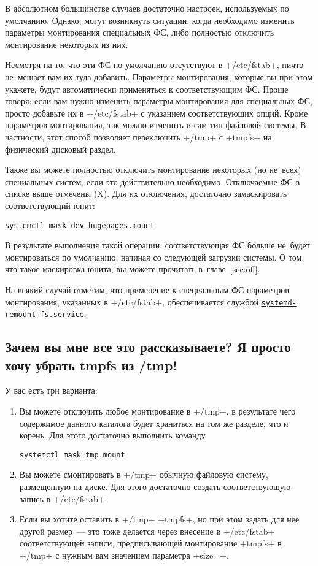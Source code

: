 \documentclass[10pt,oneside,a4paper]{article}
\newcommand{\hreftt}[2]{\href{#1}{\texttt{#2}}}
\begin{document}
В абсолютном большинстве случаев достаточно настроек, используемых по умолчанию.
Однако, могут возникнуть ситуации, когда необходимо изменить параметры
монтирования специальных ФС, либо полностью отключить монтирование некоторых из
них.

Несмотря на то, что эти ФС по умолчанию отсутствуют в +/etc/fstab+, ничто
не~мешает вам их туда добавить. Параметры монтирования, которые вы при этом
укажете, будут автоматически применяться к соответствующим ФС. Проще говоря:
если вам нужно изменить параметры монтирования для специальных ФС, просто
добавьте их в +/etc/fstab+ с указанием соответствующих опций. Кроме параметров
монтирования, так можно изменить и сам тип файловой системы. В частности, этот
способ позволяет переключить +/tmp+ с +tmpfs+ на физический дисковый раздел.

Также вы можете полностью отключить монтирование некоторых (но не~всех)
специальных систем, если это действительно необходимо. Отключаемые ФС в списке
выше отмечены (X). Для их отключения, достаточно замаскировать соответствующий
юнит:
\begin{Verbatim}
systemctl mask dev-hugepages.mount
\end{Verbatim}

В результате выполнения такой операции, соответствующая ФС больше не~будет
монтироваться по умолчанию, начиная со следующей загрузки системы. О том, что
такое маскировка юнита, вы можете прочитать в~главе~\ref{sec:off}.

На всякий случай отметим, что применение к специальным ФС параметров монтирования,
указанных в +/etc/fstab+, обеспечивается службой
\hreftt{http://www.freedesktop.org/software/systemd/man/systemd-remount-fs.service.html}%
{systemd-remount-fs.service}.

\subsection*{Зачем вы мне все это рассказываете? Я просто хочу убрать tmpfs из
/tmp!}

У вас есть три варианта:
\begin{enumerate}
	\item Вы можете отключить любое монтирование в +/tmp+, в результате чего
		содержимое данного каталога будет храниться на том же разделе, что
		и корень. Для этого достаточно выполнить команду
\begin{Verbatim}
systemctl mask tmp.mount
\end{Verbatim}
	\item Вы можете смонтировать в +/tmp+ обычную файловую систему,
		размещенную на диске. Для этого достаточно создать
		соответствующую запись в +/etc/fstab+.
	\item Если вы хотите оставить в +/tmp+ +tmpfs+, но при этом задать для
		нее другой размер~--- это тоже делается через внесение в
		+/etc/fstab+ соответствующей записи, предписывающей монтирование
		+tmpfs+ в +/tmp+ с нужным вам значением параметра +size=+.
\end{enumerate}
\end{document}
